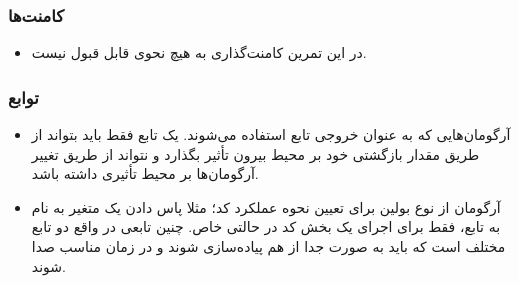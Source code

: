 \documentclass{utap}
\begin{document}
	\subsubsection{کامنت‌ها}
	  \begin{itemize}
	        \item در این تمرین کامنت‌گذاری به هیچ نحوی قابل قبول نیست.
	    \end{itemize}


	\subsubsection{توابع}
	  \begin{itemize}
	        \item آرگومان‌هایی که به عنوان خروجی تابع استفاده می‌شوند. یک تابع فقط باید بتواند از طریق مقدار بازگشتی خود بر محیط بیرون تأثیر بگذارد و نتواند از طریق تغییر آرگومان‌ها بر محیط تأثیری داشته باشد.
		\item آرگومان از نوع بولین برای تعیین نحوه عملکرد کد؛
مثلا پاس دادن یک متغیر به نام  به تابع، فقط برای اجرای یک بخش کد در حالتی خاص. چنین تابعی در واقع دو تابع مختلف است که باید به صورت جدا از هم پیاده‌سازی شوند و در زمان مناسب صدا شوند.
	    \end{itemize}
\end{document}
